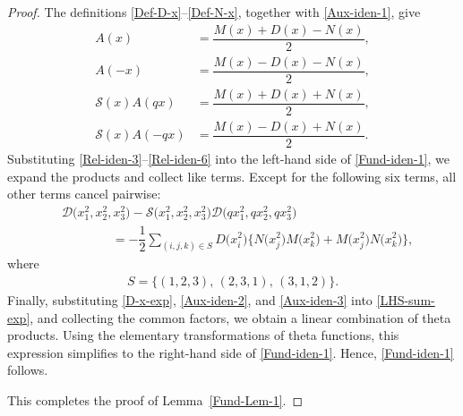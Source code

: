 \documentclass[10pt,a4paper]{amsart}
\begin{document}
\begin{proof}
The definitions \eqref{Def-D-x}--\eqref{Def-N-x}, together with \eqref{Aux-iden-1},
give
\begin{align}
A(x) &=\dfrac{M(x)+D(x)-N(x)}{2},\label{Rel-iden-3}\\
A(-x) &=\dfrac{M(x)-D(x)-N(x)}{2},\label{Rel-iden-4}\\
\mathscr{S}(x)A(qx) &=\dfrac{M(x)+D(x)+N(x)}{2},\label{Rel-iden-5}\\
\mathscr{S}(x)A(-qx) &=\dfrac{M(x)-D(x)+N(x)}{2}.\label{Rel-iden-6}
\end{align}
Substituting \eqref{Rel-iden-3}--\eqref{Rel-iden-6} into the left-hand side of
\eqref{Fund-iden-1}, we expand the products and collect like terms. Except for the
following six terms, all other terms cancel pairwise:
\begin{align}
 &\mathscr{D}\big(x_1^2,x_2^2,x_3^2\big)-\mathscr{S}\big(x_1^2,x_2^2,x_3^2\big)
\mathscr{D}\big(qx_1^2,qx_2^2,qx_3^2\big)\nonumber\\
 &\qquad\qquad=-\dfrac{1}{2}\sum_{(i,j,k)\in S}D\big(x_i^2\big)\big\{N\big(x_j^2\big)
M\big(x_k^2\big)+M\big(x_j^2\big)N\big(x_k^2\big)\big\},\label{LHS-sum-exp}
\end{align}
where
\begin{align*}
S=\{(1,2,3),\,(2,3,1),\,(3,1,2)\}.
\end{align*}
Finally, substituting \eqref{D-x-exp}, \eqref{Aux-iden-2}, and \eqref{Aux-iden-3} into
\eqref{LHS-sum-exp}, and collecting the common factors, we obtain a linear combination
of theta products. Using the elementary transformations of theta functions, this
expression simplifies to the right-hand side of \eqref{Fund-iden-1}. Hence,
\eqref{Fund-iden-1} follows.

This completes the proof of Lemma~\ref{Fund-Lem-1}.
\end{proof}
\end{document}
